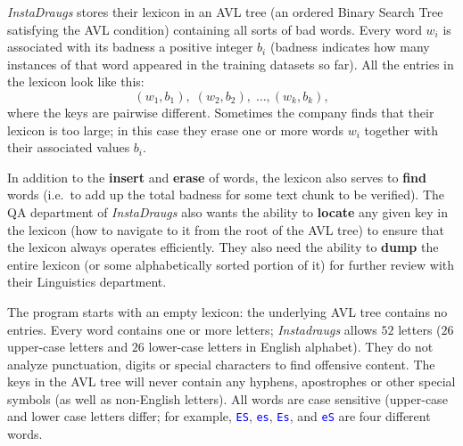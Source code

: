 \documentclass[11pt]{article}
\begin{document}
{\em InstaDraugs} stores their lexicon in an 
AVL tree (an ordered Binary Search Tree satisfying the 
AVL condition) containing all sorts 
of bad words. Every word $w_i$ is associated with its badness \textendash{}
a positive integer $b_i$ (badness indicates how many instances of that word appeared
in the training datasets so far). All the entries in the lexicon look like this:
$$(w_1,b_1),\;(w_2,b_2),\;\ldots,(w_k,b_k),$$
where the keys are pairwise different. Sometimes the company finds that their lexicon
is too large; in this case they erase one or more words $w_i$
together with their associated values $b_i$. 

In addition to the {\bf insert} and {\bf erase} of words, the
lexicon also serves to {\bf find} words (i.e.\ to add up the total 
badness for some text chunk to be verified). The QA department of {\em InstaDraugs} 
also wants the ability to {\bf locate}
any given key in the lexicon (how to navigate to it from the root of the AVL tree) 
to ensure that the lexicon always operates efficiently. 
They also need the ability to {\bf dump} the entire
lexicon (or some alphabetically sorted portion of it) for further review with 
their Linguistics department.

The program starts with an empty lexicon: the underlying AVL tree contains no entries.
Every word contains one or more letters; 
{\em Instadraugs} allows $52$ letters ($26$ upper-case letters and $26$ 
lower-case letters in English alphabet). They do not analyze punctuation, 
digits or special characters to find offensive content. 
The keys in the AVL tree will never contain any hyphens, apostrophes or 
other special symbols (as well as non-English letters). 
All words are case sensitive (upper-case and lower
case letters differ; for example, \textcolor{blue}{\tt ES}, 
\textcolor{blue}{\tt es}, \textcolor{blue}{\tt Es},
and \textcolor{blue}{\tt eS} are four different words. 
\end{document}
